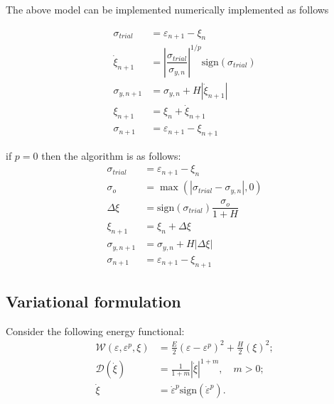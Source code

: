 \documentclass[11pt]{article}
\begin{document}
The above model can be implemented numerically implemented as follows 

\begin{align}
    \sigma_{trial} &= \varepsilon_{n+1} - \xi_n\\
    \dot{\xi}_{n+1} &= \left|\dfrac{\sigma_{trial}}{\sigma_{y,n}}\right|^{1/p}\mathrm{sign}(\sigma_{trial})\\
    \sigma_{y,n+1} &= \sigma_{y,n} + H |\dot{\xi}_{n+1}|\\
    \xi_{n+1} &= \xi_n + \dot{\xi}_{n+1}\\
    \sigma_{n+1} &= \varepsilon_{n+1} - \xi_{n+1}
\end{align}

if $p=0$ then the algorithm is as follows:
\begin{align}
    \sigma_{trial} &= \varepsilon_{n+1} - \xi_n\\
    \sigma_{o} &= \max(|\sigma_{trial} - \sigma_{y,n}|, 0)\\
    \Delta \xi &= \mathrm{sign}(\sigma_{trial})\dfrac{\sigma_{o}}{1 + H}\\
    \xi_{n+1} &= \xi_n + \Delta \xi\\
    \sigma_{y, n+1} &= \sigma_{y,n} + H |\Delta \xi|\\
    \sigma_{n+1} &= \varepsilon_{n+1} - \xi_{n+1}
\end{align}
\subsection{Variational formulation}
Consider the following energy functional:
\begin{align}
\mathcal{W}(\varepsilon, \varepsilon^p, \xi) &= \frac{E}{2}(\varepsilon - \varepsilon^p)^2 + \frac{H}{2}(\xi)^2;\\
\mathcal{D}(\dot{\xi}) &= \frac{1}{1+m}|\dot{\xi}|^{1+m}, \quad m>0;\\
\dot{\xi} &= \dot{\varepsilon}^p \mathrm{sign}(\dot{\varepsilon}^p).
\end{align}
\end{document}
